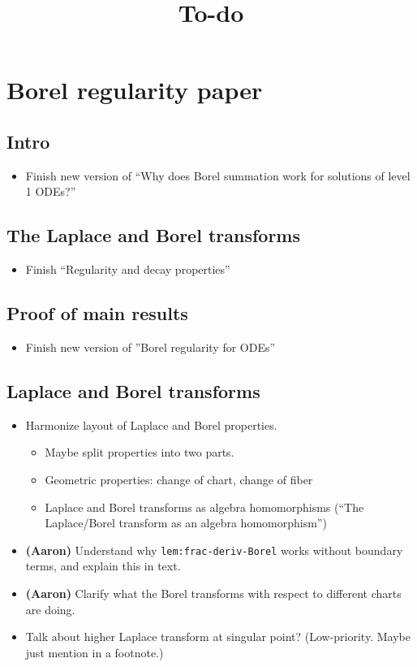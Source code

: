\documentclass{article}
\title{To-do}
\date{}
\begin{document}
\maketitle
\section{Borel regularity paper}
\subsection{Intro}
\begin{itemize}
\item Finish new version of ``Why does Borel summation work for solutions of level 1 ODEs?''
\end{itemize}
\subsection{The Laplace and Borel transforms}
\begin{itemize}
\item Finish ``Regularity and decay properties''
\end{itemize}
\subsection{Proof of main results}
\begin{itemize}
    \item Finish new version of ''Borel regularity for ODEs''
\end{itemize}
\color{gray}
\subsection{Laplace and Borel transforms}
\begin{itemize}
\item Harmonize layout of Laplace and Borel properties.
\begin{itemize}
  \item Maybe split properties into two parts.
  \item Geometric properties: change of chart, change of fiber
  \item Laplace and Borel transforms as algebra homomorphisms (``The Laplace/Borel transform as an algebra homomorphism'')
\end{itemize}
\color{black}
\item \textbf{(Aaron)} Understand why \texttt{lem:frac-deriv-Borel} works without boundary terms, and explain this in text.
\item \textbf{(Aaron)} Clarify what the Borel transforms with respect to different charts are doing.
\item Talk about higher Laplace transform at singular point? (Low-priority. Maybe just mention in a footnote.)
\end{itemize}
\end{document}
